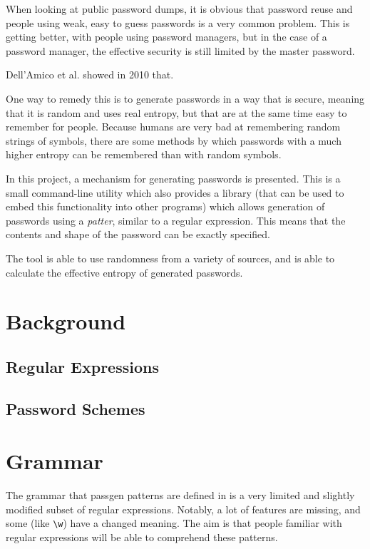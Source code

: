 \documentclass[a4paper,twocolumn]{article}
\begin{document}
When looking at public password dumps, it is obvious that password reuse and people using weak, easy to guess passwords is a very common problem. This is getting better, with people using password managers, but in the case of a password manager, the effective security is still limited by the master password.

Dell'Amico et al. showed in 2010 that\cite{5461951}. 


One way to remedy this is to generate passwords in a way that is secure, meaning that it is random and uses real entropy, but that are at the same time easy to remember for people. Because humans are very bad at remembering random strings of symbols, there are some methods by which passwords with a much higher entropy can be remembered than with random symbols.

In this project, a mechanism for generating passwords is presented. This is a small command-line utility which also provides a library (that can be used to embed this functionality into other programs) which allows generation of passwords using a \emph{patter}, similar to a regular expression. This means that the contents and shape of the password can be exactly specified.

The tool is able to use randomness from a variety of sources, and is able to calculate the effective entropy of generated passwords.

\section{Background}

\subsection{Regular Expressions}

\subsection{Password Schemes}

\section{Grammar}

The grammar that passgen patterns are defined in is a very limited and slightly modified subset of regular expressions. Notably, a lot of features are missing, and some (like \verb|\w|) have a changed meaning. The aim is that people familiar with regular expressions will be able to comprehend these patterns.
\end{document}

